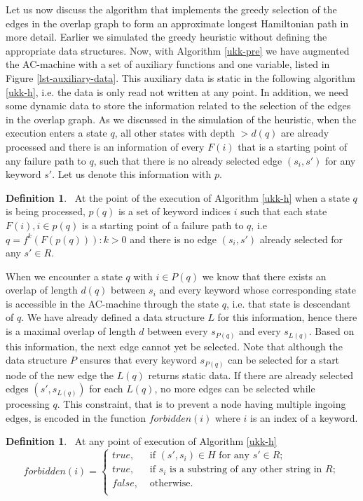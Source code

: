 \documentclass[english,twoside,censored,csm,algorithms-track-2020]{HYthesisML}
\theoremstyle{plain}
\theoremstyle{definition}
\newtheorem{definition}[theorem]{Definition}
\begin{document}
Let us now discuss the algorithm that implements the greedy selection of the edges in the
overlap graph to form an approximate longest Hamiltonian path in more detail. Earlier we simulated
the greedy heuristic without defining the appropriate data structures. Now, with Algorithm
\ref{ukk-pre} we have augmented the AC-machine with a set of auxiliary functions and one variable,
listed in Figure \ref{lst-auxiliary-data}.
This auxiliary data is static in the following algorithm \ref{ukk-h}, i.e. the data is only read
not written at any point. In addition, we need some dynamic data to store the information
related to the selection of the edges in the overlap graph. As we discussed in the simulation
of the heuristic, when the execution enters a state $q$, all other states with depth $>d(q)$ are
already processed and there is an information of every $F(i)$ that is a starting point of any failure
path to $q$,
such that there is no already selected edge $(s_i, s')$ for any keyword $s'$. Let us denote
this information with $p$.

\begin{definition}~\label{def-p}
  At the point of the execution of Algorithm \ref{ukk-h} when a state $q$ is being processed,
  $p(q)$ is a set of keyword indices $i$ such that each state $ F(i), i\in p(q)$ is
  a starting point of a failure path to $q$, i.e $q = f^k(F(p(q))) : k>0$ and there is no
  edge $(s_i, s')$ already selected for any $s'\in R$.
\end{definition}

When we encounter a state $q$ with $i\in P(q)$ we know that there exists an overlap of length
$d(q)$ between $s_i$ and every keyword whose corresponding state is accessible in the AC-machine
through the state $q$, i.e. that state is descendant of $q$. We have already defined a data structure
$L$ for this information, hence there is a maximal overlap of length $d$ between every $s_{P(q)}$
and every $s_{L(q)}$. Based on this information, the next edge cannot yet be selected.
Note that although the data structure $P$ ensures that every keyword $s_{P(q)}$ can be selected
for a start node of the new edge the $L(q)$ returns static data. If there are already selected
edges $(s',s_{L(q)})$ for each $L(q)$, no more edges can be selected while processing $q$.
This constraint, that is to prevent a node having multiple ingoing edges, is encoded in the
function $forbidden(i)$ where $i$ is an index of a keyword.

\begin{definition}~\label{def-forbidden}
  At any point of execution of Algorithm \ref{ukk-h}
  \[
  forbidden(i) =
  \begin{cases}
    true, &\text{ if }  (s',s_i)\in H \text{ for any } s'\in R; \\
    true, &\text{ if }  s_i \text{ is a substring of any other string in } R; \\
    false, &\text{ otherwise}. \\
  \end{cases}
  \]
\end{definition}
\end{document}
